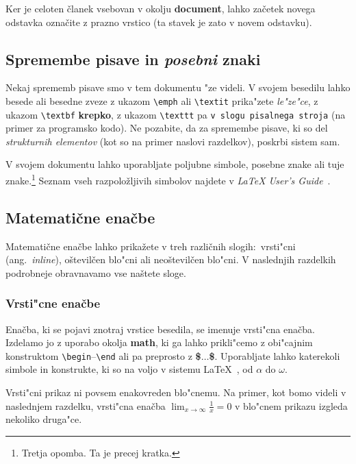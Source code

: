 \documentclass[sigconf]{acmart}
\begin{document}
Ker je celoten članek vsebovan v okolju \textbf{document}, lahko začetek
novega odstavka označite z prazno vrstico (ta stavek je zato v novem odstavku).

\subsection{Spremembe pisave in \emph{posebni} znaki}

Nekaj sprememb pisave smo v tem dokumentu "ze videli.  V svojem besedilu lahko
besede ali besedne zveze z ukazom \texttt{\textbackslash{}emph} ali
\texttt{\textbackslash{}textit} prika"zete \emph{le"ze"ce}, z ukazom
\texttt{\textbackslash{}textbf} \textbf{krepko}, z ukazom
\texttt{\textbackslash{}texttt} pa \texttt{v slogu pisalnega stroja} (na
primer za programsko kodo).  Ne pozabite, da za spremembe pisave, ki so del
\emph{strukturnih elementov} (kot so na primer naslovi razdelkov), poskrbi
sistem sam.

V svojem dokumentu lahko uporabljate poljubne simbole, posebne znake
ali tuje znake.\footnote{Tretja opomba. Ta je precej kratka.} Seznam vseh
razpoložljivih simbolov najdete v \emph{\LaTeX{} User's
Guide}~\cite{Lamport:LaTeX}.

\subsection{Matematične enačbe}

Matematične enačbe lahko prikažete v treh različnih slogih:\ vrsti"cni (ang.\
\emph{inline}), oštevilčen blo"cni ali neoštevilčen blo"cni.  V naslednjih
razdelkih podrobneje obravnavamo vse naštete sloge.

\subsubsection{Vrsti"cne enačbe}

Enačba, ki se pojavi znotraj vrstice besedila, se imenuje vrsti"cna enačba.
Izdelamo jo z uporabo okolja \textbf{math}, ki ga lahko prikli"cemo z
obi"cajnim konstruktom
\texttt{\textbackslash{}begin}--\texttt{\textbackslash{}end} ali pa preprosto
z \textbf{\$$\ldots$\$}.  Uporabljate lahko katerekoli simbole in konstrukte,
ki so na voljo v sistemu \LaTeX~\cite{Lamport:LaTeX}, od $\alpha$ do $\omega$.

Vrsti"cni prikaz ni povsem enakovreden blo"cnemu. Na primer, kot bomo videli
v naslednjem razdelku, vrsti"cna enačba
\begin{math}\lim_{x\rightarrow \infty}\frac{1}{x}=0\end{math} 
v blo"cnem prikazu izgleda nekoliko druga"ce.
\end{document}

